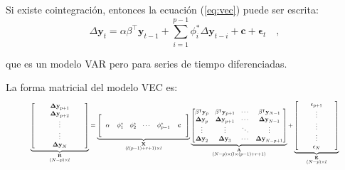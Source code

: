 Si existe cointegración, entonces la ecuación (\ref{eq:vec}) puede ser escrita:
\begin{equation}
 \label{eq:vecfull}
  \Delta \mathbf{y}_t = \alpha \beta^\intercal\mathbf{y}_{t-1} 
   + \sum_{i=1}^{p-1} \phi_i^*\Delta
   \mathbf{y}_{t-i}  + \mathbf{c} + \mathbf{\epsilon}_t \quad ,
   \end{equation}

   \noindent que es un modelo VAR pero para series de tiempo diferenciadas.

La forma matricial del modelo VEC es:
\begin{equation} \label{eq:vecmatrix}
\resizebox{0.9\hsize}{!}{$%
\underbrace{
                \left[ \begin{array}{ccc}
               \quad & \mathbf{\Delta y}_{p+1} & \quad \\ 
               \quad & \mathbf{\Delta y}_{p+2} & \quad \\
               \quad & \vdots & \quad \\ 
               \quad & \vdots & \quad \\  
               \quad & \mathbf{\Delta y}_N & \quad 
               \end{array} \right]}_{\substack{\mathbf{B}\\ (N-p) \times l }} =
   \underbrace{\left[ 
    \begin{array}{cccccc}
     \quad & \quad & \quad & \quad & \quad & \quad \\
     \alpha & \phi_1^*  & \phi_2^* & \cdots & \phi_{p-1}^* & \mathbf{c} \\  
     \quad &\quad &\quad & \quad & \quad & \quad
     \end{array} 
      \right]}_{\substack{ \mathbf{X}\\ (l(p-1)+r+1) \times l}}
\underbrace{\begin{bmatrix} 
   \beta^\intercal \mathbf{y}_{p} & 
   \beta^\intercal \mathbf{y}_{p+1}&
   \cdots & \beta^\intercal \mathbf{y}_{N-1} \\
   \mathbf{\Delta y}_p & \mathbf{\Delta y}_{p+1} & \cdots 
   & \mathbf{\Delta y}_{N-1} \\ 
   \vdots & \vdots & \ddots & \vdots \\
   \mathbf{\Delta y}_2 & \mathbf{\Delta y}_{3} & \cdots 
   & \mathbf{\Delta y}_{N-p+1} \\ 
   \end{bmatrix}}_{\substack{\mathbf{A} \\ (N-p) \times (l \times (p-1)+r+1) }}
+
\underbrace{\begin{bmatrix}
              \quad &\mathbf{\epsilon}_{p+1} & \quad \\ 
              \quad &\vdots & \quad\\ 
              \quad & \vdots & \quad\\
              \quad & \vdots & \quad\\
              \quad &\mathbf{\epsilon}_N & \quad
             \end{bmatrix}}_{\substack{\mathbf{E}\\ (N-p) \times l }} 
$}
\end{equation}

